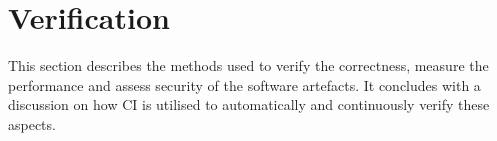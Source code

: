
\section{Verification}
\label{sec:verification}

This section describes the methods used to verify the correctness, measure the performance and assess security of the software artefacts. It concludes with a discussion on how CI is utilised to automatically and continuously verify these aspects.






